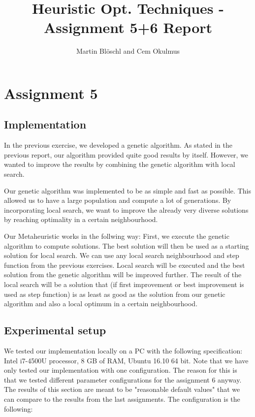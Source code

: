 \documentclass [11pt]{article}
\begin{document}
\title{ Heuristic Opt. Techniques - Assignment 5+6 Report}
\author{ Martin Blöschl and Cem Okulmus }

\maketitle
\thispagestyle{empty}


\section{Assignment 5}


\subsection{Implementation}

In the previous exercise, we developed a genetic algorithm. As stated in the previous report, our algorithm provided quite good results by itself. However, we wanted to improve the results by combining the genetic algorithm with local search.

Our genetic algorithm was implemented to be as simple and fast as possible. This allowed us to have a large population and compute a lot of generations. By incorporating local search, we want to improve the already very diverse solutions by reaching optimality in a certain neighbourhood.

Our Metaheuristic works in the follwing way: First, we execute the genetic algorithm to compute solutions. The best solution will then be used as a starting solution for local search. We can use any local search neighbourhood and step function from the previous exercises. Local search will be executed and the best solution from the genetic algorithm will be improved further. The result of the local search will  be a solution that (if first improvement or best improvement is used as step function) is as least as good as the solution from our genetic algorithm and also a local optimum in a certain neighbourhood.


\subsection{Experimental setup}


We tested our implementation locally on a PC with the following specification: Intel i7-4500U processor, 8 GB of RAM, Ubuntu 16.10 64 bit. Note that we have only tested our implementation with one configuration. The reason for this is that we tested different parameter configurations for the assignment 6 anyway. The results of this section are meant to be "reasonable default values" that we can compare to the results from the last assignments.
The configuration is the following:
\end{document}
